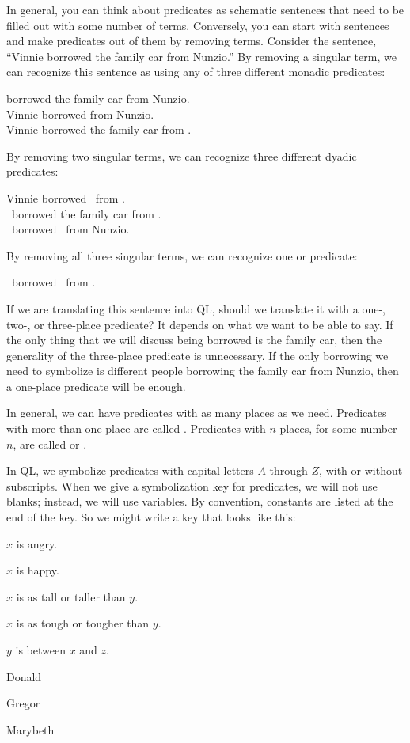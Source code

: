 In general, you can think about predicates as schematic sentences that need to be filled out with some number of terms. Conversely, you can start with sentences and make predicates out of them by removing terms. Consider the sentence, ``Vinnie borrowed the family car from Nunzio.'' By removing a singular term, we can recognize this sentence as using any of three different monadic predicates:
\begin{center}
\blank borrowed the family car from Nunzio.\\
Vinnie borrowed \blank from Nunzio.\\
Vinnie borrowed the family car from \blank.
\end{center}

By removing two singular terms, we can recognize three different dyadic predicates:
\begin{center}
Vinnie borrowed \blank\ from \blank.\\
\blank\ borrowed the family car from \blank.\\
\blank\ borrowed \blank\ from Nunzio.
\end{center}

By removing all three singular terms, we can recognize one  or  predicate:
\begin{center}
\blank\ borrowed \blank\ from \blank.
\end{center}

If we are translating this sentence into QL, should we translate it with a one-, two-, or three-place predicate? It depends on what we want to be able to say. If the only thing that we will discuss being borrowed is the family car, then the generality of the three-place predicate is unnecessary. If the only borrowing we need to symbolize is different people borrowing the family car from Nunzio, then a one-place predicate will be enough.

In general, we can have predicates with as many places as we need. Predicates with more than one place are called . Predicates with $n$ places, for some number $n$, are called  or .

In QL, we symbolize predicates with capital letters $A$ through $Z$, with or without subscripts. When we give a symbolization key for predicates, we will not use blanks; instead, we will use variables. By convention, constants are listed at the end of the key. So we might write a key that looks like this:
\begin{description}
\label{DMG_symbolization_key}
\item[Ax:] $x$ is angry.
\item[Hx:] $x$ is happy.
\item[T$_1$xy:] $x$ is as tall or taller than $y$.
\item[T$_2$xy:] $x$ is as tough or tougher than $y$.
\item[Bxyz:] $y$ is between $x$ and $z$.
\item[d:] Donald
\item[g:] Gregor
\item[m:] Marybeth
\end{description}

